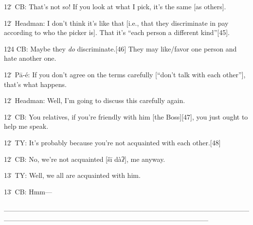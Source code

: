 12\. CB: That's not so!  If you look at what I pick, it's the same [as others].

12\. Headman: I don't think it's like that [i.e., that they discriminate in pay
according to who the picker is].  That it's ``each person a different kind''[45].

124 CB: Maybe they \textit{do} discriminate.[46]  They may like/favor one person
and hate another one.

12\. Pā-é: If you don't agree on the terms carefully [``don't talk with each
other''], that's what happens.

12\. Headman: Well, I'm going to discuss this carefully again.

12\. CB: You relatives, if you're friendly with him [the Boss][47], you just ought
to help me speak.

12\. TY: It's probably because you're not acquainted with each other.[48]

12\. CB: No, we're not acquainted [šī dàʔ], me anyway.

13\. TY: Well, we all are acquainted with him.

13\. CB: Hmm---

\_\_\_\_\_\_\_\_\_\_\_\_\_\_\_\_\_\_\_\_\_\_\_\_\_\_\_\_\_\_\_\_\_\_\_\_\_\_\_\_\_\_\_\_\_\_\_\_\_\_\_\_\_\_\_\_\_\_\_\_\_\_\_\_\_\_\_\_\_\_\_\_\_\_\_\_\_\_\_\_\_\_\_\_\_\_\_\_

